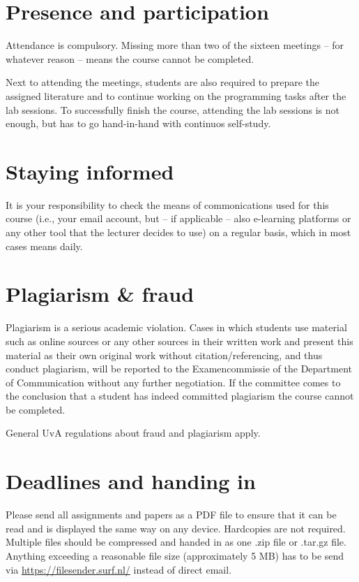 \documentclass[a4paper,10pt]{report}
\begin{document}
\section{Presence and participation}
Attendance is compulsory. Missing more than two of the sixteen meetings – for whatever reason – means the course cannot be completed.

Next to attending the meetings, students are also required to prepare the assigned literature and to continue working on the programming tasks after the lab sessions. To successfully finish the course, attending the lab sessions is not enough, but has to go hand-in-hand with continuos self-study.

\section{Staying informed}
It is your responsibility to check the means of commonications used for this course (i.e., your email account, but – if applicable – also e-learning platforms or any other tool that the lecturer decides to use) on a regular basis, which in most cases means daily.

\section{Plagiarism \& fraud}
Plagiarism is a serious academic violation. Cases in which students use material such as online sources or any other sources in their written work and present this material as their own original work without citation/referencing, and thus conduct plagiarism, will be reported to the Examencommissie of the Department of Communication without any further negotiation. If the committee comes to the conclusion that a student has indeed committed plagiarism the course cannot be completed. 

General UvA regulations about fraud and plagiarism apply.

\section{Deadlines and handing in}
Please send all assignments and papers as a PDF file to ensure that it can be read and is displayed the same way on any device. Hardcopies are not required. Multiple files should be compressed and handed in as one .zip file or .tar.gz file. Anything exceeding a reasonable file size (approximately 5 MB) has to be send via \url{https://filesender.surf.nl/} instead of direct email.
\end{document}
